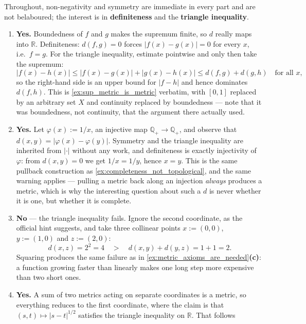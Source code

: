 \begin{exercisesolution}
Throughout, non-negativity and symmetry are immediate in every part and are not belaboured; the
interest is in \textbf{definiteness} and the \textbf{triangle inequality}.
\begin{enumerate}[label=\textbf{\arabic*.}]
  \item \textbf{Yes.} Boundedness of $f$ and $g$ makes the supremum finite, so $d$ really maps
    into $\mathbb{R}$. Definiteness: $d(f,g)=0$ forces $|f(x)-g(x)| = 0$ for every $x$, i.e.\
    $f=g$. For the triangle inequality, estimate pointwise and only then take the supremum:
    \[|f(x)-h(x)| \leq |f(x)-g(x)| + |g(x)-h(x)| \leq d(f,g) + d(g,h) \quad \text{for all } x,\]
    so the right-hand side is an upper bound for $|f-h|$ and hence dominates $d(f,h)$. This is
    \cref{ex:sup_metric_is_metric} verbatim, with $[0,1]$ replaced by an arbitrary set $X$ and
    continuity replaced by boundedness --- note that it was boundedness, not continuity, that
    the argument there actually used.
  \item \textbf{Yes.} Let $\varphi(x) := 1/x$, an injective map $\mathbb{Q}_+ \to \mathbb{Q}_+$,
    and observe that $d(x,y) = |\varphi(x)-\varphi(y)|$. Symmetry and the triangle inequality
    are inherited from $|\cdot|$ without any work, and definiteness is exactly injectivity of
    $\varphi$: from $d(x,y)=0$ we get $1/x = 1/y$, hence $x=y$. This is the same pullback
    construction as \cref{ex:completeness_not_topological}, and the same warning applies ---
    pulling a metric back along an injection \emph{always} produces a metric, which is why the
    interesting question about such a $d$ is never whether it is one, but whether it is
    complete.
  \item \textbf{No} --- the triangle inequality fails. Ignore the second coordinate, as the
    official hint suggests, and take three collinear points $x := (0,0)$, $y := (1,0)$ and
    $z := (2,0)$:
    \[d(x,z) = 2^2 = 4 \quad > \quad d(x,y) + d(y,z) = 1 + 1 = 2.\]
    Squaring produces the same failure as in
    \cref{ex:metric_axioms_are_needed}\textbf{(c)}: a function growing faster than linearly
    makes one long step more expensive than two short ones.
  \item \textbf{Yes.} A sum of two metrics acting on separate coordinates is a metric, so
    everything reduces to the first coordinate, where the claim is that
    $(s,t) \mapsto |s-t|^{1/2}$ satisfies the triangle inequality on $\mathbb{R}$. That follows

\end{enumerate}
\end{exercisesolution}
